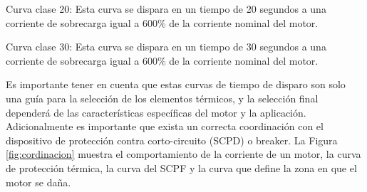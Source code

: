 Curva clase 20: Esta curva se dispara en un tiempo de 20 segundos a una corriente de sobrecarga igual a 600\% de la corriente nominal del motor.

Curva clase 30: Esta curva se dispara en un tiempo de 30 segundos a una corriente de sobrecarga igual a 600\% de la corriente nominal del motor.

Es importante tener en cuenta que estas curvas de tiempo de disparo son solo una guía para la selección de los elementos térmicos, y la selección final dependerá de las características específicas del motor y la aplicación. Adicionalmente es importante que exista un correcta coordinación con el dispositivo de protección contra corto-circuito (SCPD) o breaker. La Figura \ref{fig:cordinacion} muestra el comportamiento de la corriente de un motor, la curva de protección térmica, la curva del SCPF y la curva que define la zona en que el motor se daña.

